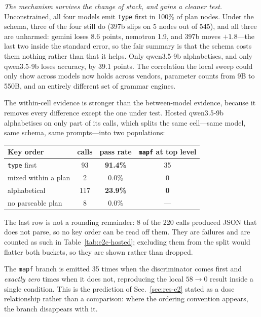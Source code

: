 \documentclass[10pt,twocolumn]{article}
\newcommand{\code}[1]{\texttt{\small #1}}
\begin{document}
\emph{The mechanism survives the change of stack, and gains a cleaner test.}
Unconstrained, all four models emit \code{type} first in 100\% of plan nodes.
Under the schema, three of the four still do (397b slips on 5 nodes out of
545), and all three are unharmed: gemini loses 8.6 points, nemotron 1.9, and
397b moves $+1.8$---the last two inside the standard error, so the fair
summary is that the schema costs them nothing rather than that it helps. Only
qwen3.5-9b alphabetises, and only qwen3.5-9b loses accuracy, by 39.1 points.
The correlation the local sweep could only show across models now holds across
vendors, parameter counts from 9B to 550B, and an entirely different set of
grammar engines.

The within-cell evidence is stronger than the between-model evidence, because
it removes every difference except the one under test. Hosted qwen3.5-9b
alphabetises on only part of its calls, which splits the same cell---same
model, same schema, same prompts---into two populations:

\begin{center}\footnotesize
\begin{tabular}{lccc}
\toprule
Key order & calls & pass rate & \code{mapf} at top level \\
\midrule
\code{type} first  &  93 & \textbf{91.4\%} & 35 \\
mixed within a plan &   2 & 0.0\% & 0 \\
alphabetical        & 117 & \textbf{23.9\%} & \textbf{0} \\
\midrule
no parseable plan   &   8 & 0.0\% & --- \\
\bottomrule
\end{tabular}
\end{center}

The last row is not a rounding remainder: 8 of the 220 calls produced JSON
that does not parse, so no key order can be read off them. They are failures
and are counted as such in Table~\ref{tab:e2c-hosted}; excluding them from the
split would flatter both buckets, so they are shown rather than dropped.

The \code{mapf} branch is emitted 35 times when the discriminator comes first
and \emph{exactly zero} times when it does not, reproducing the local
$58\to0$ result inside a single condition. This is the prediction of
Sec.~\ref{sec:res-e2} stated as a dose relationship rather than a comparison:
where the ordering convention appears, the branch disappears with it.
\end{document}
